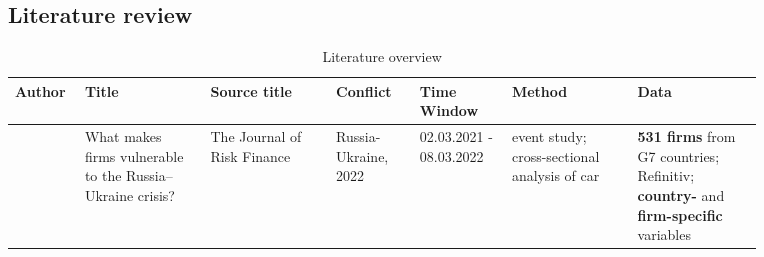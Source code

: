 \documentclass[12pt,a4paper]{article}
\begin{document}
{\begin{appendix}
\begin{landscape}
\section{Literature review}
\begin{spacing}{0.8}
\fontsize{6}{10}\selectfont
\begin{longtable}[c]
{
p{0.06\linewidth} %
p{0.15\linewidth} %
p{0.15\linewidth} %
p{0.10\linewidth} %
p{0.11\linewidth} %
p{0.15\linewidth} %
p{0.15\linewidth} %
}
\caption{Literature overview}
\label{literature_overview}
\\
\hline
  \textbf{Author} & 
  \textbf{Title} & 
  \textbf{Source title} & 
  \textbf{Conflict} & 
  \textbf{Time Window} & 
  \textbf{Method} & 
  \textbf{Data} \\ 
\hline
  \endfirsthead
  \cite{abbassi_what_2022} %
  & What makes firms vulnerable to the Russia–Ukraine crisis? %
  & The Journal of Risk Finance 
  & Russia-Ukraine, 2022 
  & 02.03.2021 - 08.03.2022
  & event study; cross-sectional analysis of \gls{car} &
  \textbf{531 firms} from G7 countries; Refinitiv; \textbf{country-} and \textbf{firm-specific} variables \\

\end{longtable}
\end{spacing}
\end{landscape}
\end{appendix}}
\end{document}
